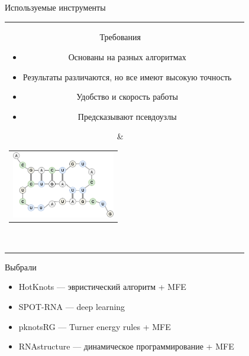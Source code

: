 \documentclass{beamer}
\begin{document}
\begin{frame}{Используемые инструменты}
\setlength\tabcolsep{1pt}
\begin{tabular}{cl}  
    \parbox{0.6\linewidth}{
        Требования
        \begin{itemize}
            \item Основаны на разных алгоритмах
            \item Результаты различаются, но все имеют высокую точность
            \item Удобство и скорость работы
            \item Предсказывают псевдоузлы
        \end{itemize}
    }
    & \begin{tabular}{l}
    
        \vspace{-4mm}
        \includegraphics[width=4.5cm]{pics/pseudoknot.png}
    \end{tabular}  \\
\end{tabular}

\vspace{6mm}
        Выбрали
        \begin{itemize}
            \item HotKnots --- эвристический алгоритм + MFE
            \item SPOT-RNA --- deep learning
            \item pknotsRG --- Turner energy rules + MFE
            \item RNAstructure --- динамическое программирование + MFE
         \end{itemize} 
\end{frame}
\end{document}
